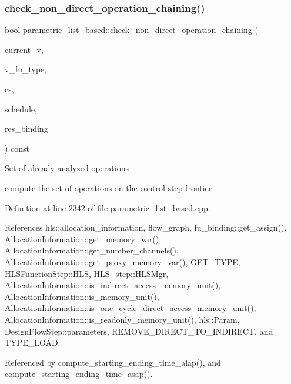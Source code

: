 \subsubsection{\texorpdfstring{check\+\_\+non\+\_\+direct\+\_\+operation\+\_\+chaining()}{check\_non\_direct\_operation\_chaining()}}
{\footnotesize\ttfamily bool parametric\+\_\+list\+\_\+based\+::check\+\_\+non\+\_\+direct\+\_\+operation\+\_\+chaining (\begin{DoxyParamCaption}\item[{\hyperlink{graph_8hpp_abefdcf0544e601805af44eca032cca14}{vertex}}]{current\+\_\+v,  }\item[{unsigned int}]{v\+\_\+fu\+\_\+type,  }\item[{const Control\+Step}]{cs,  }\item[{const \hyperlink{schedule_8hpp_a85e4dea8a1611026193d8ca13fc5a260}{Schedule\+Const\+Ref}}]{schedule,  }\item[{\hyperlink{fu__binding_8hpp_a619181df8ab98d7b7e17de58ac44b065}{fu\+\_\+binding\+Ref}}]{res\+\_\+binding }\end{DoxyParamCaption}) const\hspace{0.3cm}{\ttfamily [private]}}

Set of already analyzed operations

compute the set of operations on the control step frontier 

Definition at line 2342 of file parametric\+\_\+list\+\_\+based.\+cpp.



References hls\+::allocation\+\_\+information, flow\+\_\+graph, fu\+\_\+binding\+::get\+\_\+assign(), Allocation\+Information\+::get\+\_\+memory\+\_\+var(), Allocation\+Information\+::get\+\_\+number\+\_\+channels(), Allocation\+Information\+::get\+\_\+proxy\+\_\+memory\+\_\+var(), G\+E\+T\+\_\+\+T\+Y\+PE, H\+L\+S\+Function\+Step\+::\+H\+LS, H\+L\+S\+\_\+step\+::\+H\+L\+S\+Mgr, Allocation\+Information\+::is\+\_\+indirect\+\_\+access\+\_\+memory\+\_\+unit(), Allocation\+Information\+::is\+\_\+memory\+\_\+unit(), Allocation\+Information\+::is\+\_\+one\+\_\+cycle\+\_\+direct\+\_\+access\+\_\+memory\+\_\+unit(), Allocation\+Information\+::is\+\_\+readonly\+\_\+memory\+\_\+unit(), hls\+::\+Param, Design\+Flow\+Step\+::parameters, R\+E\+M\+O\+V\+E\+\_\+\+D\+I\+R\+E\+C\+T\+\_\+\+T\+O\+\_\+\+I\+N\+D\+I\+R\+E\+CT, and T\+Y\+P\+E\+\_\+\+L\+O\+AD.



Referenced by compute\+\_\+starting\+\_\+ending\+\_\+time\+\_\+alap(), and compute\+\_\+starting\+\_\+ending\+\_\+time\+\_\+asap().

